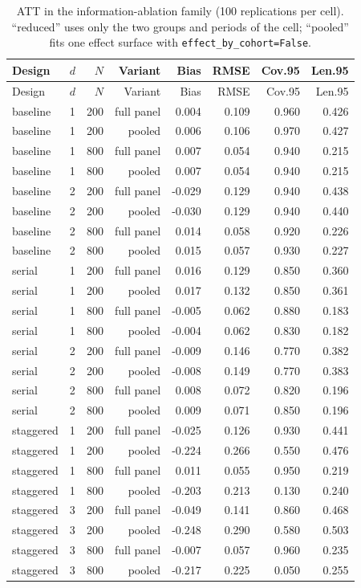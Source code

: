 {\footnotesize
\begin{longtable}{llrrrrrr}
\caption{ATT in the information-ablation family (100 replications per cell). ``reduced'' uses only the two groups and periods of the cell; ``pooled'' fits one effect surface with \texttt{effect\_by\_cohort=False}.}\label{tab:infoatt}\\
\toprule
Design & $d$ & $N$ & Variant & Bias & RMSE & Cov.95 & Len.95 \\
\midrule
\endfirsthead
\toprule
Design & $d$ & $N$ & Variant & Bias & RMSE & Cov.95 & Len.95 \\
\midrule
\endhead
\bottomrule
\endlastfoot
baseline & 1 & 200 & full panel & 0.004 & 0.109 & 0.960 & 0.426 \\
baseline & 1 & 200 & pooled & 0.006 & 0.106 & 0.970 & 0.427 \\
baseline & 1 & 800 & full panel & 0.007 & 0.054 & 0.940 & 0.215 \\
baseline & 1 & 800 & pooled & 0.007 & 0.054 & 0.940 & 0.215 \\
baseline & 2 & 200 & full panel & -0.029 & 0.129 & 0.940 & 0.438 \\
baseline & 2 & 200 & pooled & -0.030 & 0.129 & 0.940 & 0.440 \\
baseline & 2 & 800 & full panel & 0.014 & 0.058 & 0.920 & 0.226 \\
baseline & 2 & 800 & pooled & 0.015 & 0.057 & 0.930 & 0.227 \\
serial & 1 & 200 & full panel & 0.016 & 0.129 & 0.850 & 0.360 \\
serial & 1 & 200 & pooled & 0.017 & 0.132 & 0.850 & 0.361 \\
serial & 1 & 800 & full panel & -0.005 & 0.062 & 0.880 & 0.183 \\
serial & 1 & 800 & pooled & -0.004 & 0.062 & 0.830 & 0.182 \\
serial & 2 & 200 & full panel & -0.009 & 0.146 & 0.770 & 0.382 \\
serial & 2 & 200 & pooled & -0.008 & 0.149 & 0.770 & 0.383 \\
serial & 2 & 800 & full panel & 0.008 & 0.072 & 0.820 & 0.196 \\
serial & 2 & 800 & pooled & 0.009 & 0.071 & 0.850 & 0.196 \\
staggered & 1 & 200 & full panel & -0.025 & 0.126 & 0.930 & 0.441 \\
staggered & 1 & 200 & pooled & -0.224 & 0.266 & 0.550 & 0.476 \\
staggered & 1 & 800 & full panel & 0.011 & 0.055 & 0.950 & 0.219 \\
staggered & 1 & 800 & pooled & -0.203 & 0.213 & 0.130 & 0.240 \\
staggered & 3 & 200 & full panel & -0.049 & 0.141 & 0.860 & 0.468 \\
staggered & 3 & 200 & pooled & -0.248 & 0.290 & 0.580 & 0.503 \\
staggered & 3 & 800 & full panel & -0.007 & 0.057 & 0.960 & 0.235 \\
staggered & 3 & 800 & pooled & -0.217 & 0.225 & 0.050 & 0.255 \\
\end{longtable}
}

